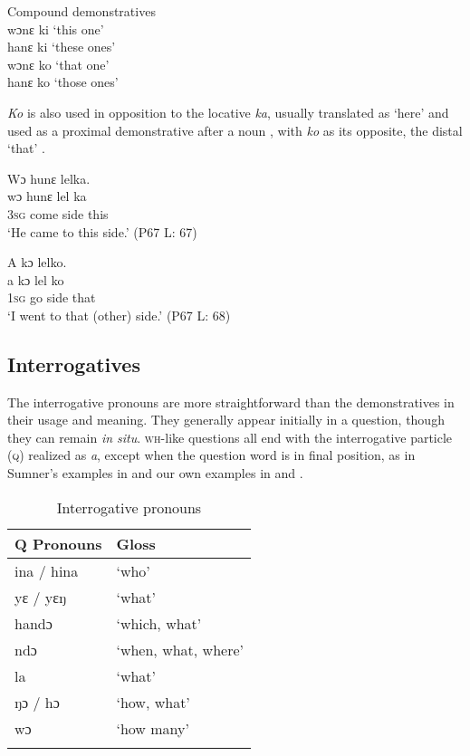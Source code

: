 \ea%
    \label{ex:58} Compound demonstratives\\
    wɔnɛ ki ‘this one'\\      
    hanɛ ki ‘these ones'\\
    wɔnɛ ko ‘that one'\\
    hanɛ ko ‘those ones'
\z

\textit{Ko} is also used in opposition to the locative \textit{ka}, usually translated as ‘here' and used as a proximal demonstrative after a noun , with \textit{ko} as its opposite, the distal ‘that' .

\ea%
    \label{ex:59}
    \ea \label{ex:59a}Wɔ hunɛ lelka.\\                   
    \gll wɔ    hunɛ  lel    ka \\               
    \textsc{3sg}  come  side  this\\             
    \glt ‘He came to this side.' (P67 L: 67)
    
    \ex \label{ex:59b}  A kɔ lelko.\\
    \gll a    kɔ    lel    ko\\
     \textsc{1sg}  go   side  that\\
    \glt ‘I went to that (other) side.' (P67 L: 68)
\z
\z

\subsection{Interrogatives}
 \hypertarget{Toc115517766}{}\label{sec:3.3.4}
The interrogative pronouns are more straightforward than the demonstratives in their usage and meaning. They generally appear initially in a question, though they can remain \textit{in situ}. \textsc{wh}{}-like questions all end with the interrogative particle (\textsc{q}) realized as \textit{a}, except when the question word is in final position, as in Sumner's examples in  and our own examples in  and .

\begin{table}
\caption{\label{tab:wordcat:17}Interrogative pronouns}



\begin{tabular}{ll}
\lsptoprule
Q Pronouns & Gloss\\
\midrule
ina / hina & ‘who'\\
yɛ / yɛŋ & ‘what'\\
handɔ & ‘which, what'\\
ndɔ & ‘when, what, where'\\
la & ‘what'\\
ŋɔ / hɔ & ‘how, what'\\
wɔ & ‘how many'\\
\lspbottomrule
\end{tabular}
\end{table}

